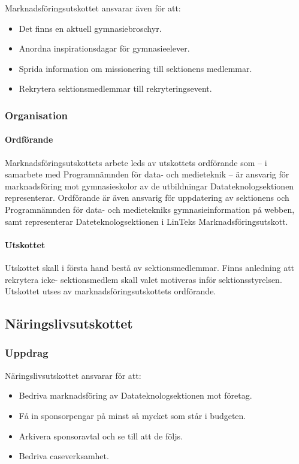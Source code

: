 \documentclass{datateknologsektionen-document}
\begin{document}
Marknadsföringsutskottet ansvarar även för att:
\begin{itemize}
  \item Det finns en aktuell gymnasiebroschyr.
  \item Anordna inspirationsdagar för gymnasieelever.
  \item Sprida information om missionering till sektionens medlemmar.
  \item Rekrytera sektionsmedlemmar till rekryteringsevent.
\end{itemize}
\subsubsection{Organisation}
\paragraph{Ordförande}
Marknadsföringsutskottets arbete leds av utskottets ordförande som – i samarbete med
Programnämnden för data- och medieteknik – är ansvarig för marknadsföring mot
gymnasieskolor av de utbildningar Datateknologsektionen representerar. Ordförande är även
ansvarig för uppdatering av sektionens och Programnämnden för data- och medietekniks
gymnasieinformation på webben, samt representerar Dateteknologsektionen i LinTeks Marknadsföringsutskott.

\paragraph{Utskottet}

Utskottet skall i första hand bestå av sektionsmedlemmar. Finns anledning att rekrytera icke-
sektionsmedlem skall valet motiveras inför sektionsstyrelsen. Utskottet utses av
marknadsföringsutskottets ordförande.

\subsection{Näringslivsutskottet}
\label{naru}
\subsubsection{Uppdrag}
Näringslivsutskottet ansvarar för att:
\begin{itemize}
  \item Bedriva marknadsföring av Datateknologsektionen mot företag.
  \item Få in sponsorpengar på minst så mycket som står i budgeten.
  \item Arkivera sponsoravtal och se till att de följs.
  \item Bedriva caseverksamhet.
\end{itemize}
\end{document}
